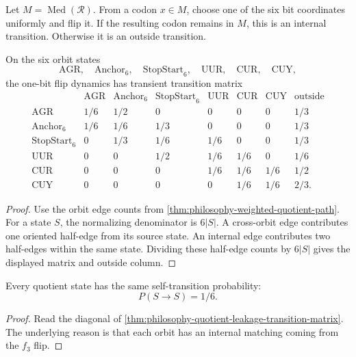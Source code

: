 \begin{definition}
\label{def:philosophy-one-bit-flip-median-closure}
Let $M=\operatorname{Med}(\mathcal{R})$. From a codon $x\in M$, choose
one of the six bit coordinates uniformly and flip it. If the resulting
codon remains in $M$, this is an internal transition. Otherwise it is an
outside transition.
\end{definition}

\begin{theorem}
\label{thm:philosophy-quotient-leakage-transition-matrix}
On the six orbit states
$$
  \mathrm{AGR},\quad
  \mathrm{Anchor}_{6},\quad
  \mathrm{StopStart}_{6},\quad
  \mathrm{UUR},\quad
  \mathrm{CUR},\quad
  \mathrm{CUY},
$$
the one-bit flip dynamics has transient transition matrix
$$
\begin{array}{c|rrrrrr|r}
 & \mathrm{AGR} & \mathrm{Anchor}_{6} & \mathrm{StopStart}_{6}
 & \mathrm{UUR} & \mathrm{CUR} & \mathrm{CUY} & \text{outside}\\
\hline
\mathrm{AGR} & 1/6 & 1/2 & 0 & 0 & 0 & 0 & 1/3\\
\mathrm{Anchor}_{6} & 1/6 & 1/6 & 1/3 & 0 & 0 & 0 & 1/3\\
\mathrm{StopStart}_{6} & 0 & 1/3 & 1/6 & 1/6 & 0 & 0 & 1/3\\
\mathrm{UUR} & 0 & 0 & 1/2 & 1/6 & 1/6 & 0 & 1/6\\
\mathrm{CUR} & 0 & 0 & 0 & 1/6 & 1/6 & 1/6 & 1/2\\
\mathrm{CUY} & 0 & 0 & 0 & 0 & 1/6 & 1/6 & 2/3.
\end{array}
$$
\end{theorem}
\begin{proof}
Use the orbit edge counts from
\autoref{thm:philosophy-weighted-quotient-path}. For a state $S$, the
normalizing denominator is $6|S|$. A cross-orbit edge contributes one
oriented half-edge from its source state. An internal edge contributes
two half-edges within the same state. Dividing these half-edge counts
by $6|S|$ gives the displayed matrix and outside column.
\end{proof}

\begin{corollary}
\label{cor:philosophy-uniform-self-retention}
Every quotient state has the same self-transition probability:
$$
  P(S\to S)=1/6.
$$
\end{corollary}
\begin{proof}
Read the diagonal of
\autoref{thm:philosophy-quotient-leakage-transition-matrix}. The
underlying reason is that each orbit has an internal matching coming
from the $f_{3}$ flip.
\end{proof}

